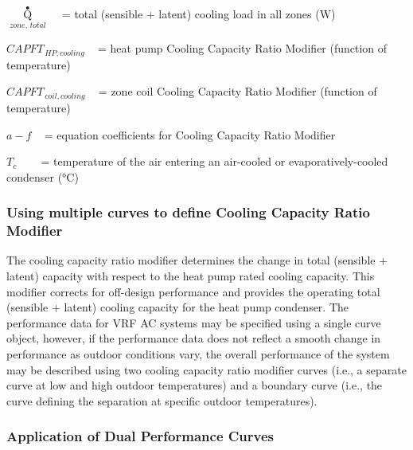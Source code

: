 \({\mathop Q\limits^ \bullet_{zone,\,total}}\) ~ = total (sensible + latent) cooling load in all zones (W)

\(CAPF{T_{\,HP,cooling}}\) ~ = heat pump Cooling Capacity Ratio Modifier (function of temperature)

\(CAPF{T_{\,coil,cooling}}\) ~ = zone coil Cooling Capacity Ratio Modifier (function of temperature)

\(a - f\) ~ = equation coefficients for Cooling Capacity Ratio Modifier

\({T_c}\) ~~~ = temperature of the air entering an air-cooled or evaporatively-cooled condenser (°C)

\subsubsection{Using multiple curves to define Cooling Capacity Ratio Modifier}\label{using-multiple-curves-to-define-cooling-capacity-ratio-modifier}

The cooling capacity ratio modifier determines the change in total (sensible + latent) capacity with respect to the heat pump rated cooling capacity. This modifier corrects for off-design performance and provides the operating total (sensible + latent) cooling capacity for the heat pump condenser. The performance data for VRF AC systems may be specified using a single curve object, however, if the performance data does not reflect a smooth change in performance as outdoor conditions vary, the overall performance of the system may be described using two cooling capacity ratio modifier curves (i.e., a separate curve at low and high outdoor temperatures) and a boundary curve (i.e., the curve defining the separation at specific outdoor temperatures).

\subsubsection{Application of Dual Performance Curves}\label{application-of-dual-performance-curves}

